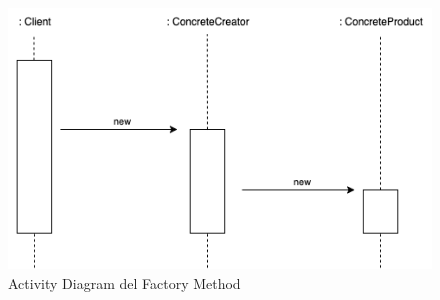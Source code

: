 \begin{figure}[H]
    \centering
    \includegraphics[width=0.8\linewidth]{assets/pattern/factory-method/factory-method-activity.drawio.png}
    \caption{Activity Diagram del Factory Method}
\end{figure}

\newpage